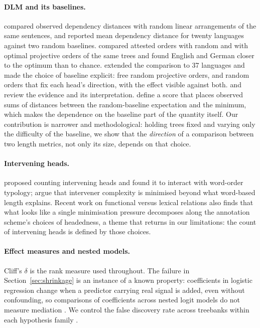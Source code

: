 \documentclass[11pt]{article}
\begin{document}
\paragraph{DLM and its baselines.} \citet{ferrericancho2004euclidean} compared observed dependency distances with random linear arrangements of the same sentences, and \citet{liu2008dependency} reported mean dependency distance for twenty languages against two random baselines. \citet{gildea2010grammars} compared attested orders with random and with optimal projective orders of the same trees and found English and German closer to the optimum than to chance. \citet{futrell2015largescale} extended the comparison to 37 languages and made the choice of baseline explicit: free random projective orders, and random orders that fix each head's direction, with the effect visible against both. \citet{temperley2018minimizing} and \citet{futrell2020locality} review the evidence and its interpretation. \citet{ferrericancho2022optimality} define a score that places observed sums of distances between the random-baseline expectation and the minimum, which makes the dependence on the baseline part of the quantity itself. Our contribution is narrower and methodological: holding trees fixed and varying only the difficulty of the baseline, we show that the \emph{direction} of a comparison between two length metrics, not only its size, depends on that choice.

\paragraph{Intervening heads.} \citet{yadav2020wordorder} proposed counting intervening heads and found it to interact with word-order typology; \citet{yadav2022reappraisal} argue that intervener complexity is minimised beyond what word-based length explains. Recent work on functional versus lexical relations \citep{gerdes2026grammar} also finds that what looks like a single minimisation pressure decomposes along the annotation scheme's choices of headedness, a theme that returns in our limitations: the count of intervening heads is defined by those choices.

\paragraph{Effect measures and nested models.} Cliff's $\delta$ \citep{cliff1993dominance} is the rank measure used throughout. The failure in Section~\ref{sec:shrinkage} is an instance of a known property: coefficients in logistic regression change when a predictor carrying real signal is added, even without confounding, so comparisons of coefficients across nested logit models do not measure mediation \citep{mood2010logistic}. We control the false discovery rate across treebanks within each hypothesis family \citep{benjamini1995fdr}.
\end{document}
